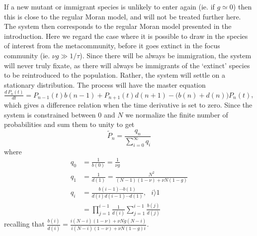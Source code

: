 If a new mutant or immigrant species is unlikely to enter again (ie. if $g\simeq 0$) then this is close to the regular Moran model, and will not be treated further here. 
The system then corresponds to the regular Moran model presented in the introduction. 
Here we regard the case where it is possible to draw in the species of interest from the metacommunity, before it goes extinct in the focus community (ie. $\nu g \gg 1/\tau$). 
Since there will be always be immigration, the system will never truly fixate, as there will always be immigrants of the `extinct' species to be reintroduced to the population.  
Rather, the system will settle on a stationary distribution. 
The process will have the master equation $\frac{d\,P_n(t)}{dt} = P_{n-1}(t)b(n-1) + P_{n+1}(t)d(n+1) - \big(b(n)+d(n)\big)P_n(t)$,
which gives a difference relation when the time derivative is set to zero. 
Since the system is constrained between $0$ and $N$ we normalize the finite number of probabilities and sum them to unity to get
\begin{equation}
\widetilde{P}_n = \frac{q_n}{\sum_{i=0}^\infty q_i}
\end{equation}
where
\begin{align*}
 q_0 &= \frac{1}{b(0)} = \frac{1}{\nu g} \\
 q_1 &= \frac{1}{d(1)} = \frac{N^2}{(N-1)(1-\nu) + \nu N(1-g)} \\
 q_i &= \frac{b(i-1)\cdots b(1)}{d(i)d(i-1)\cdots d(1)}, \text{  } i\rangle1 \\
     &= \prod_{j=1}^{i-1} \frac{1}{d(i)}\sum_{j=1}^{i-1}\frac{b(j)}{d(j)}
\end{align*}
recalling that $\frac{b(i)}{d(i)} = \frac{i(N-i)(1-\nu) + \nu Ng(N-i)}{i(N-i)(1-\nu) + \nu N(1-g)i}$.
%

